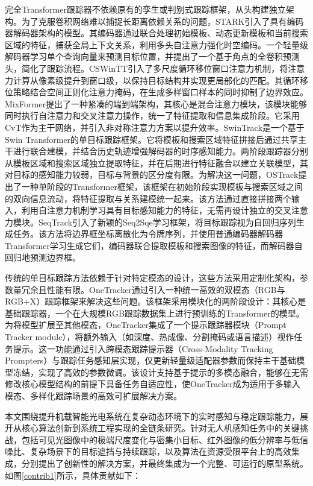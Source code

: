 完全Transformer跟踪器不依赖原有的孪生或判别式跟踪框架，从头构建独立架构。为了克服卷积网络难以捕捉长距离依赖关系的问题，STARK\cite{Yan2021STARK}引入了具有编码器解码器架构的模型。其编码器通过联合处理初始模板、动态更新模板和当前搜索区域的特征，捕获全局上下文关系，利用多头自注意力强化时空编码。一个轻量级解码器学习单个查询向量来预测目标位置，并提出了一个基于角点的全卷积预测头，简化了跟踪流程。CSWinTT\cite{Song2022CSWinTT}引入了多尺度循环移位窗口注意力机制，将注意力计算从像素级提升到窗口级，以保持目标结构并实现更局部化的匹配。其循环移位策略结合空间正则化注意力掩码，在生成多样窗口样本的同时抑制了边界效应。MixFormer\cite{Cui2022MixFormer}提出了一种紧凑的端到端架构，其核心是混合注意力模块，该模块能够同时执行自注意力和交叉注意力操作，统一了特征提取和信息集成阶段。它采用CvT\cite{Wu2021CvT}作为主干网络，并引入非对称注意力方案以提升效率。SwinTrack\cite{Lin2022SwinTrack}是一个基于Swin Transformer\cite{Liu2021SwinTH}的单目标跟踪框架。它将模板和搜索区域特征拼接后通过共享主干进行联合建模，并结合历史轨迹增强解码器的时序感知能力。两阶段跟踪器分别从模板区域和搜索区域独立提取特征，并在后期进行特征融合以建立关联模型，其对目标的感知能力较弱，目标与背景的区分度有限。为解决这一问题，OSTrack\cite{ye2022ostrack}提出了一种单阶段的Transformer框架，该框架在初始阶段实现模板与搜索区域之间的双向信息流动，将特征提取与关系建模统一起来。该方法通过直接拼接两个输入，利用自注意力机制学习具有目标感知能力的特征，无需再设计独立的交叉注意力模块。SeqTrack\cite{Chen2023SeqTrack}引入了新颖的Seq2Sqe\cite{Ilya2014Seq2Seq}学习框架，将目标跟踪视为自回归序列生成任务。该方法将边界框坐标离散化为令牌序列，并使用普通编码器解码器Transformer学习生成它们，编码器联合提取模板和搜索图像的特征，而解码器自回归地预测边界框。

传统的单目标跟踪方法依赖于针对特定模态的设计，这些方法采用定制化架构，参数量冗余且性能有限。OneTracker\cite{Hong2024OneTracker}通过引入一种统一高效的双模态（RGB与RGB+X）跟踪框架来解决这些问题。该框架采用模块化的两阶段设计：其核心是基础跟踪器，一个在大规模RGB跟踪数据集上进行预训练的Transformer的模型。为将模型扩展至其他模态，OneTracker集成了一个提示跟踪器模块（Prompt Tracker module），将额外输入（如深度、热成像、分割掩码或语言描述）视作任务提示。这一功能通过引入跨模态跟踪提示器（Cross-Modality Tracking Prompters）与跟踪任务感知层实现，仅更新轻量级适配器参数而保持主干基础模型冻结，实现了高效的参数微调。该设计支持基于提示的多模态融合，能够在无需修改核心模型结构的前提下具备任务自适应性，使OneTracker成为适用于多输入模态、多样化跟踪场景的高效可扩展解决方案。



本文围绕提升机载智能光电系统在复杂动态环境下的实时感知与稳定跟踪能力，展开从核心算法创新到系统工程实现的全链条研究。针对无人机感知任务中的关键挑战，包括可见光图像中的极端尺度变化与密集小目标、红外图像的低分辨率与低信噪比、复杂场景下的目标遮挡与持续跟踪，以及算法在资源受限平台上的高效集成，分别提出了创新性的解决方案，并最终集成为一个完整、可运行的原型系统。如图\ref{contrib1}所示，具体贡献如下：

